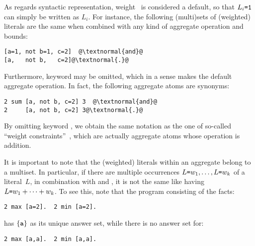 As regards syntactic representation,
weight~ is considered a default,
so that $L_i\texttt{=}\texttt{1}$ can simply be written as $L_i$.
For instance, the following (multi)sets of (weighted) literals are the same
when combined with any kind of aggregate operation and bounds:
\begin{lstlisting}[numbers=none,escapechar=@]
[a=1, not b=1, c=2]  @\textnormal{and}@
[a,   not b,   c=2]@\textnormal{.}@
\end{lstlisting}
%
Furthermore,
keyword  may be omitted, which in a sense makes  the default
aggregate operation.
In fact, the following aggregate atoms are synonyms:
\begin{lstlisting}[numbers=none,escapechar=@]
2 sum [a, not b, c=2] 3  @\textnormal{and}@
2     [a, not b, c=2] 3@\textnormal{.}@
\end{lstlisting}
By omitting keyword , we obtain the same notation as the one of 
so-called ``weight constraints''~\cite{siniso02a,lparseManual}, which are actually aggregate atoms
whose operation is addition.

It is important to note that the (weighted) literals within an aggregate
belong to a multiset.
In particular, if there are multiple occurrences
$L\texttt{=}w_1,\dots,L\texttt{=}w_k$
of a literal~$L$, in combination with  and ,
it is not the same like having $L\texttt{=}w_1+\dots+w_k$.
To see this, note that the program consisting of the facts:
\begin{lstlisting}[numbers=none]
2 max [a=2].  2 min [a=2].
\end{lstlisting}
has $\{\texttt{a}\}$ as its unique answer set, while there is no answer set for:
\begin{lstlisting}[numbers=none]
2 max [a,a].  2 min [a,a].
\end{lstlisting}

